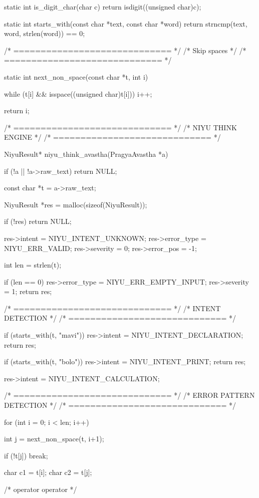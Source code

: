\documentclass{article}
\begin{document}
static int is_digit_char(char c)
{
    return isdigit((unsigned char)c);
}

static int starts_with(const char *text, const char *word)
{
    return strncmp(text, word, strlen(word)) == 0;
}

/* ============================= */
/* Skip spaces                   */
/* ============================= */

static int next_non_space(const char *t, int i)
{
    while (t[i] && isspace((unsigned char)t[i]))
        i++;

    return i;
}


/* ============================= */
/* NIYU THINK ENGINE             */
/* ============================= */

NiyuResult* niyu_think_avastha(PragyaAvastha *a)
{
    if (!a || !a->raw_text)
        return NULL;

    const char *t = a->raw_text;

    NiyuResult *res = malloc(sizeof(NiyuResult));

    if (!res)
        return NULL;

    res->intent = NIYU_INTENT_UNKNOWN;
    res->error_type = NIYU_ERR_VALID;
    res->severity = 0;
    res->error_pos = -1;

    int len = strlen(t);

    if (len == 0)
    {
        res->error_type = NIYU_ERR_EMPTY_INPUT;
        res->severity = 1;
        return res;
    }

    /* ============================= */
    /* INTENT DETECTION              */
    /* ============================= */

    if (starts_with(t, "mavi"))
    {
        res->intent = NIYU_INTENT_DECLARATION;
        return res;
    }

    if (starts_with(t, "bolo"))
    {
        res->intent = NIYU_INTENT_PRINT;
        return res;
    }

    res->intent = NIYU_INTENT_CALCULATION;

    /* ============================= */
    /* ERROR PATTERN DETECTION       */
    /* ============================= */

    for (int i = 0; i < len; i++)
    {
        int j = next_non_space(t, i+1);

        if (!t[j])
            break;

        char c1 = t[i];
        char c2 = t[j];

        /* operator operator */

}}
\end{document}
